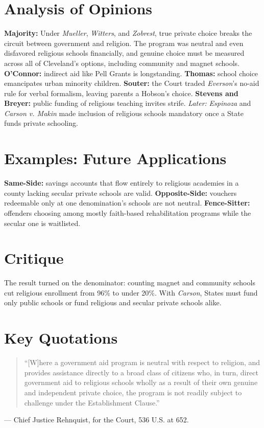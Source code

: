 \documentclass[12pt]{article}
\begin{document}
\section{Analysis of Opinions}
\textbf{Majority:} Under \textit{Mueller}, \textit{Witters}, and \textit{Zobrest}, true private choice breaks the circuit between government and religion. The program was neutral and even disfavored religious schools financially, and genuine choice must be measured across all of Cleveland's options, including community and magnet schools. \textbf{O'Connor:} indirect aid like Pell Grants is longstanding. \textbf{Thomas:} school choice emancipates urban minority children. \textbf{Souter:} the Court traded \textit{Everson}'s no-aid rule for verbal formalism, leaving parents a Hobson's choice. \textbf{Stevens and Breyer:} public funding of religious teaching invites strife. \emph{Later:} \textit{Espinoza} and \textit{Carson v. Makin} made inclusion of religious schools mandatory once a State funds private schooling.

\section{Examples: Future Applications}
\textbf{Same-Side:} savings accounts that flow entirely to religious academies in a county lacking secular private schools are valid. \textbf{Opposite-Side:} vouchers redeemable only at one denomination's schools are not neutral. \textbf{Fence-Sitter:} offenders choosing among mostly faith-based rehabilitation programs while the secular one is waitlisted.

\section{Critique}
The result turned on the denominator: counting magnet and community schools cut religious enrollment from 96\% to under 20\%. With \textit{Carson}, States must fund only public schools or fund religious and secular private schools alike.

\section{Key Quotations}
\begin{quote}
``[W]here a government aid program is neutral with respect to religion, and provides assistance directly to a broad class of citizens who, in turn, direct government aid to religious schools wholly as a result of their own genuine and independent private choice, the program is not readily subject to challenge under the Establishment Clause.''
\end{quote}
\noindent --- Chief Justice Rehnquist, for the Court, 536 U.S. at 652.
\end{document}
